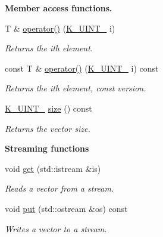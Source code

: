 \begin{Indent}\textbf{ Member access functions.}\par
\begin{DoxyCompactItemize}
\item 
T \& \mbox{\hyperlink{classKalman_1_1KVector_acde68007d321ab29ea25e76bd0782ec0}{operator()}} (\mbox{\hyperlink{namespaceKalman_a628a50cae10f6e2035393d4f96c698bd}{K\+\_\+\+U\+I\+N\+T\+\_}} i)
\begin{DoxyCompactList}\small\item\em Returns the {\ttfamily i\textquotesingle{}th} element. \end{DoxyCompactList}\item 
const T \& \mbox{\hyperlink{classKalman_1_1KVector_adcf14175cc30eddf671e836fe98112ba}{operator()}} (\mbox{\hyperlink{namespaceKalman_a628a50cae10f6e2035393d4f96c698bd}{K\+\_\+\+U\+I\+N\+T\+\_}} i) const
\begin{DoxyCompactList}\small\item\em Returns the {\ttfamily i\textquotesingle{}th} element, {\ttfamily const} version. \end{DoxyCompactList}\item 
\mbox{\hyperlink{namespaceKalman_a628a50cae10f6e2035393d4f96c698bd}{K\+\_\+\+U\+I\+N\+T\+\_}} \mbox{\hyperlink{classKalman_1_1KVector_ab0efdd85b2dc957c99eb1ef25a2c365f}{size}} () const
\begin{DoxyCompactList}\small\item\em Returns the vector size. \end{DoxyCompactList}\end{DoxyCompactItemize}
\end{Indent}
\begin{Indent}\textbf{ Streaming functions}\par
\begin{DoxyCompactItemize}
\item 
void \mbox{\hyperlink{classKalman_1_1KVector_ad0ded1cdecfc9c58d5f42ae97b19ebbd}{get}} (std\+::istream \&is)
\begin{DoxyCompactList}\small\item\em Reads a vector from a stream. \end{DoxyCompactList}\item 
void \mbox{\hyperlink{classKalman_1_1KVector_a70d3ae491edd45ef3524f78ef68eb5d2}{put}} (std\+::ostream \&os) const
\begin{DoxyCompactList}\small\item\em Writes a vector to a stream. \end{DoxyCompactList}\end{DoxyCompactItemize}
\end{Indent}


